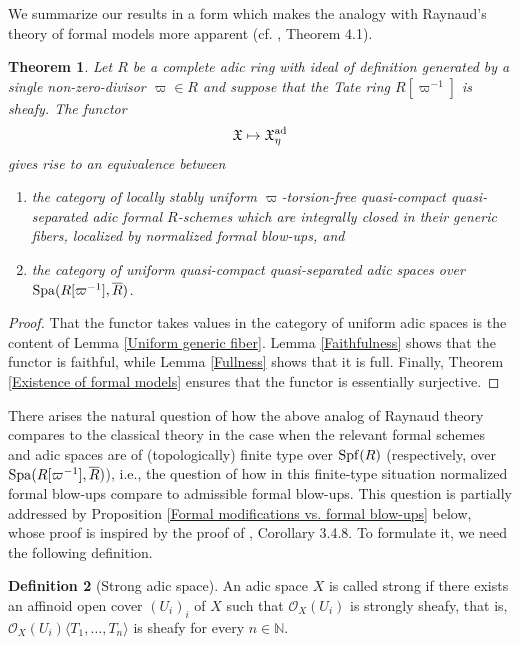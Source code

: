 \documentclass[12pt,twoside,a4paper]{article}
\newtheorem{thm}{Theorem}[section]
\theoremstyle{definition}
\newtheorem{mydef}[thm]{Definition}
\theoremstyle{remark}
\newcommand\ad{{\rm ad}}
\newcommand\Spa{{\rm Spa}}
\newcommand\Spf{{\rm Spf}}
\begin{document}
We summarize our results in a form which makes the analogy with Raynaud's theory of formal models more apparent (cf. \cite{BL1}, Theorem 4.1).
\begin{thm}\label{Analog of Raynaud theory}Let $R$ be a complete adic ring with ideal of definition generated by a single non-zero-divisor $\varpi\in R$ and suppose that the Tate ring $R[\varpi^{-1}]$ is sheafy. The functor \begin{equation*}\mathfrak{X}\mapsto \mathfrak{X}_{\eta}^{\ad}\end{equation*}gives rise to an equivalence between \begin{enumerate}[(1)]\item the category of locally stably uniform $\varpi$-torsion-free quasi-compact quasi-separated adic formal $R$-schemes which are integrally closed in their generic fibers, localized by normalized formal blow-ups, and 
\item the category of uniform quasi-compact quasi-separated adic spaces over $\Spa(R[\varpi^{-1}], \overline{R})$.\end{enumerate}\end{thm}
\begin{proof}That the functor takes values in the category of uniform adic spaces is the content of Lemma \ref{Uniform generic fiber}. Lemma \ref{Faithfulness} shows that the functor is faithful, while Lemma \ref{Fullness} shows that it is full. Finally, Theorem \ref{Existence of formal models} ensures that the functor is essentially surjective.\end{proof}
There arises the natural question of how the above analog of Raynaud theory compares to the classical theory in the case when the relevant formal schemes and adic spaces are of (topologically) finite type over $\Spf(R)$ (respectively, over $\Spa(R[\varpi^{-1}], \overline{R})$), i.e., the question of how in this finite-type situation normalized formal blow-ups compare to admissible formal blow-ups. This question is partially addressed by Proposition \ref{Formal modifications vs. formal blow-ups} below, whose proof is inspired by the proof of \cite{Temkin11}, Corollary 3.4.8. To formulate it, we need the following definition.
\begin{mydef}[Strong adic space]An adic space $X$ is called strong if there exists an affinoid open cover $(U_{i})_{i}$ of $X$ such that $\mathcal{O}_{X}(U_{i})$ is strongly sheafy, that is, $\mathcal{O}_{X}(U_{i})\langle T_1,\dots, T_n\rangle$ is sheafy for every $n\in\mathbb{N}$.\end{mydef}
\end{document}
